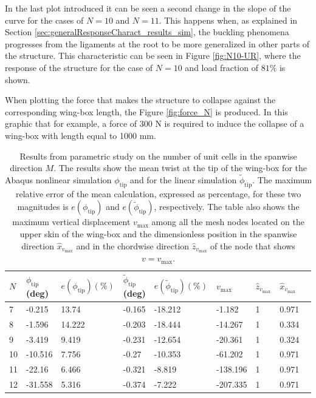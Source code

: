     In the last plot introduced it can be seen a second change in the slope of the curve for the cases of $N = 10$ and $N = 11$. This happens when, as explained in Section \ref{sec:generalResponseCharact_results_sim}, the buckling phenomena progresses from the ligaments at the root to be more generalized in other parts of the structure. This characteristic can be seen in Figure \ref{fig:N10-UR}, where the response of the structure for the case of $N = 10$ and load fraction of $81\%$ is shown.

    When plotting the force that makes the structure to collapse against the corresponding wing-box length, the Figure \ref{fig:force_N} is produced. In this graphic that for example, a force of 300 N is required to induce the collapse of a wing-box with length equal to 1000 mm.

    \begin{table}[!htpb] %
      \centering
      \begin{tabular}{|l|l|l|l|l|l|l|l|l|}
      \hline
      $N$ & $\phi_{\mathrm{tip}}$ (deg) & $e(\phi_{\mathrm{tip}}) (\%)$ & $\tilde{\phi}_{\mathrm{tip}}$ (deg) & $e(\tilde{\phi}_{\mathrm{tip}}) (\%)$ & $v_{\mathrm{max}}$ & $\hat{z}_{v_{\mathrm{max}}}$ & $\hat{x}_{v_{\mathrm{max}}}$ \\ \hline
      7 & -0.215 & 13.74 & -0.165 & -18.212 & -1.182 & 1 & 0.971 \\ \hline
      8 & -1.596 & 14.222 & -0.203 & -18.444 & -14.267 & 1 & 0.334 \\ \hline
      9 & -3.419 & 9.419 & -0.231 & -12.654 & -20.361 & 1 & 0.324 \\ \hline
      10 & -10.516 & 7.756 & -0.27 & -10.353 & -61.202 & 1 & 0.971 \\ \hline
      11 & -22.16 & 6.466 & -0.321 & -8.819 & -138.196 & 1 & 0.971 \\ \hline
      12 & -31.558 & 5.316 & -0.374 & -7.222 & -207.335 & 1 & 0.971 \\ \hline
      \end{tabular}
      \caption[Results from parametric study on the number of unit cells in the spanwise direction]{Results from parametric study on the number of unit cells in the spanwise direction $M$. The results show the mean twist at the tip of the wing-box for the Abaqus nonlinear simulation $\phi_{\mathrm{tip}}$ and for the linear simulation $\tilde{\phi}_{\mathrm{tip}}$. The maximum relative error of the mean calculation, expressed as percentage, for these two magnitudes is $e(\phi_{\mathrm{tip}})$ and $e(\tilde{\phi}_{\mathrm{tip}})$, respectively. The table also shows the maximum vertical displacement $v_{\mathrm{max}}$ among all the mesh nodes located on the upper skin of the wing-box and the dimensionless position in the spanwise direction $\hat{x}_{v_{\mathrm{max}}}$ and in the chordwise direction $\hat{z}_{v_{\mathrm{max}}}$ of the node that shows $v = v_{\mathrm{max}}$.}
      \label{tab:para_N}
    \end{table}

